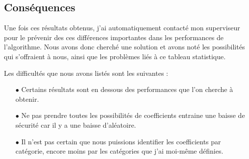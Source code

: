 \documentclass[12pt, a4paper]{memoir}
\begin{document}
  \subsection{Conséquences}
  
  Une fois ces résultats obtenus, j'ai automatiquement contacté mon superviseur pour le prévenir des ces
  différences importantes dans les performances de l'algorithme. Nous avons donc cherché une solution et 
  avons noté les possibilités qui s'offraient à nous, ainsi que les problèmes liés à ce tableau statistique.
  
  Les difficultés que nous avons listés sont les suivantes :
  \begin{itemize}
   \item [$\bullet$] Certains résultats sont en dessous des performances que l'on cherche à obtenir.
   \item [$\bullet$] Ne pas prendre toutes les possibilités de coefficients entraine une baisse de sécurité car 
   il y a une baisse d'aléatoire.
   \item [$\bullet$] Il n'est pas certain que nous puissions identifier les coefficients par catégorie, encore moins
   par les catégories que j'ai moi-même définies.
  \end{itemize}
  
\end{document}
